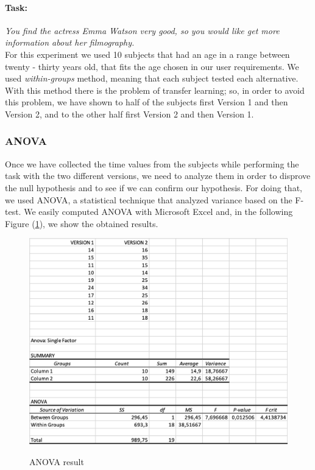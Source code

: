 \documentclass[12pt, a4paper]{article}
\numberwithin{figure}{section}
\begin{document}
\paragraph{Task:} \textit{You find the actress Emma Watson very good, so you would like
	get more information about her filmography.}\\

\noindent
For this experiment we used 10 subjects that had an age in a range between twenty - thirty years old, that
fits the age chosen in our user requirements.
We used \textit{within-groups} method, meaning that each subject tested each alternative.
With this method there is the problem of transfer learning; so, in order to avoid this problem,
we have shown to half of the subjects first Version 1 and then Version 2, and to the other
half first Version 2 and then Version 1.

\subsubsection{ANOVA}

Once we have collected the time values from the subjects while performing the task with the two
different versions, we need to analyze them in order to disprove the null hypothesis and to see
if we can confirm our hypothesis.
For doing that, we used ANOVA, a statistical technique that analyzed variance based on the
F-test. We easily computed ANOVA with Microsoft Excel and, in the following Figure (\ref{fig:anova}),
we show the obtained results.

\begin{center}
	\begin{figure}[H]
		\centering
		\includegraphics[width=1\textwidth]{images/anova.png}\\
		\caption{ANOVA result}
		\label{fig:anova}
	\end{figure}
\end{center}
\end{document}
